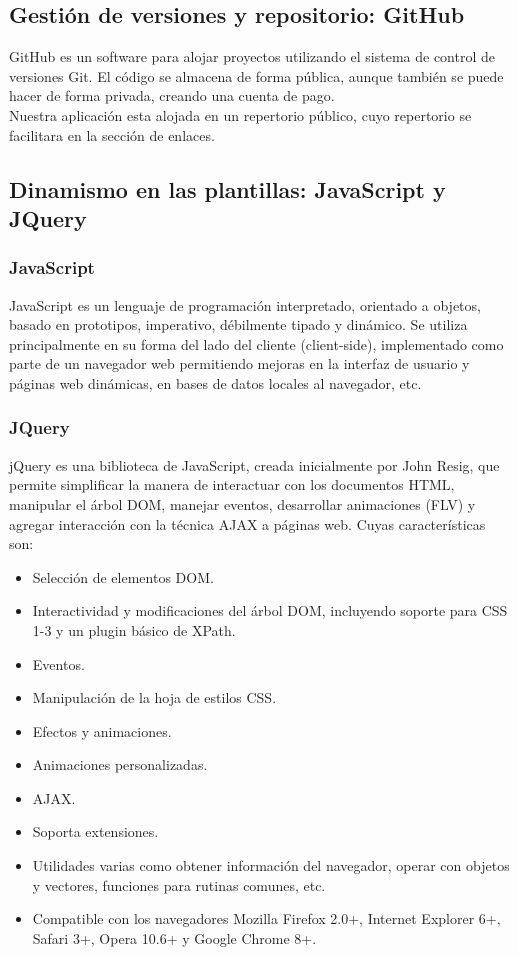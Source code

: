 \subsection{Gestión de versiones y repositorio: GitHub}

GitHub es un software para alojar proyectos utilizando el sistema de control de versiones Git. 
El código se almacena de forma pública, aunque también se puede hacer de forma privada, creando una cuenta de pago.\\

Nuestra aplicación esta alojada en un repertorio público, cuyo repertorio se facilitara en la sección de enlaces.

\subsection{Dinamismo en las plantillas: JavaScript y JQuery}

\subsubsection{JavaScript}
JavaScript es un lenguaje de programación interpretado, orientado a objetos, basado en prototipos, imperativo, débilmente tipado y dinámico. 
Se utiliza principalmente en su forma del lado del cliente (client-side), implementado como parte de un navegador web permitiendo mejoras en 
la interfaz de usuario y páginas web dinámicas, en bases de datos locales al navegador, etc.

\subsubsection{JQuery}
jQuery es una biblioteca de JavaScript, creada inicialmente por John Resig, que permite simplificar la manera de interactuar con los documentos HTML,
manipular el árbol DOM, manejar eventos, desarrollar animaciones (FLV) y agregar interacción con la técnica AJAX a páginas web. Cuyas características son:

\begin{itemize}
  \item Selección de elementos DOM.
  \item Interactividad y modificaciones del árbol DOM, incluyendo soporte para CSS 1-3 y un plugin básico de XPath.
  \item Eventos.
  \item Manipulación de la hoja de estilos CSS.
  \item Efectos y animaciones.
  \item Animaciones personalizadas.
  \item AJAX.
  \item Soporta extensiones.
  \item Utilidades varias como obtener información del navegador, operar con objetos y vectores, funciones para rutinas comunes, etc.
  \item Compatible con los navegadores Mozilla Firefox 2.0+, Internet Explorer 6+, Safari 3+, Opera 10.6+ y Google Chrome 8+.
\end{itemize}

